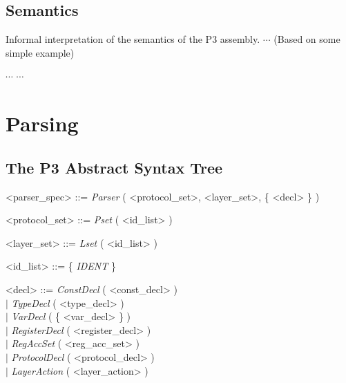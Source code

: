 \documentclass{article}
\begin{document}
\subsection{Semantics}

Informal interpretation of the semantics of the P3 assembly. $\cdots$ (Based on some simple example)

\begin{flushleft}
$\cdots$ $\cdots$
\end{flushleft}


\section{Parsing}

\subsection{The P3 Abstract Syntax Tree}

\begin{grammar} \small

{\renewcommand\baselinestretch{0}\selectfont
<parser\_spec>   ::= \textit{Parser} ( <protocol\_set>, <layer\_set>, \{ <decl> \} )

<protocol\_set>     ::=  \textit{Pset} ( <id\_list> )

<layer\_set>     ::=   \textit{Lset} ( <id\_list> )

<id\_list>     ::=   \{ \emph{IDENT} \}

<decl>     ::=   \textit{ConstDecl} ( <const\_decl> )  \\
     \hspace*{0.6cm} $\mid$  \textit{TypeDecl} ( <type\_decl> )  \\
     \hspace*{0.6cm} $\mid$  \textit{VarDecl} ( \{ <var\_decl> \} )  \\
     \hspace*{0.6cm} $\mid$  \textit{RegisterDecl} ( <register\_decl> )  \\
     \hspace*{0.6cm} $\mid$  \textit{RegAccSet} ( <reg\_acc\_set> )  \\
     \hspace*{0.6cm} $\mid$  \textit{ProtocolDecl} ( <protocol\_decl> ) \\
     \hspace*{0.6cm} $\mid$  \textit{LayerAction} ( <layer\_action> )

\par}

\end{grammar}
\end{document}
